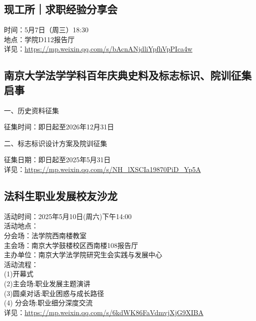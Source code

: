 \documentclass[letterpaper, 12pt]{article}
\begin{document}
\begin{multicols}{2}
\subsection{现工所｜求职经验分享会} %
时间：5月7日（周三）18:30
\\地点：学院D112报告厅
\\详见：\url{https://mp.weixin.qq.com/s/bAcnANjdliYpfhVpPIca4w}

\subsection{南京大学法学学科百年庆典史料及标志标识、院训征集启事} %
一、历史资料征集

征集时间：即日起至2026年12月31日

二、标志标识设计方案及院训征集

征集日期：即日起至2025年5月31日
\\详见：\url{https://mp.weixin.qq.com/s/NH_lXSCIa19870PiD_Yp5A}

\subsection{法科生职业发展校友沙龙} %
活动时间：2025年5月10日(周六)下午14:00	
\\活动地点：
\\分会场：法学院西南楼教室
\\主会场：南京大学鼓楼校区西南楼108报告厅
\\主办单位：南京大学法学院研究生会实践与发展中心	
\\活动流程：
\\(1)开幕式
\\(2)主会场:职业发展主题演讲
\\(3)圆桌对话:职业困惑与成长路径
\\(4) 分会场:职业细分深度交流
\\详见：\url{https://mp.weixin.qq.com/s/6kdWK86FaVdmvjXjG9XIBA}


\end{multicols}
\end{document}
